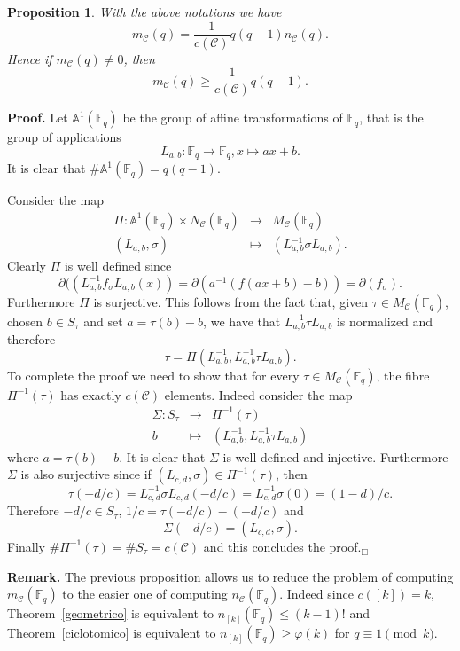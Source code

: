 \documentclass[a4paper,twoside]{article}
\newtheorem{Proposition}{Proposition}[section]
\begin{document}
\begin{Proposition}\label{normal} With the above notations
we have
$$m_{\mathcal C}(q)=\frac{1}{c(\mathcal C)}q(q-1)n_{\mathcal C}(q).$$
Hence if $m_{\mathcal C}(q)\neq0$, then
$$m_{\mathcal C}(q)\geq \frac{1}{c(\mathcal C)}q(q-1).$$
\end{Proposition}

\noindent\textbf{Proof.} Let $\mathbb A^1(\mathbb F_q)$ be the
group of affine transformations of $\mathbb F_q$, that is the
group of applications
$$L_{a,b}:\mathbb F_q \rightarrow \mathbb F_q, x\mapsto ax+b.$$
It is clear that $\#\mathbb A^1(\mathbb F_q)=q(q-1)$.

Consider the map
$$\begin{array}{rcl}
\Pi: \mathbb A^1(\mathbb F_q)\times N_{\mathcal C}(\mathbb F_q) & \rightarrow &  M_{\mathcal C}(\mathbb F_q)\\
\left(L_{a,b},\sigma\right) & \mapsto & (L_{a,b}^{-1}\sigma L_{a,b}).\end{array}$$
Clearly $\Pi$ is well defined since
$$\partial((L_{a,b}^{-1}f_\sigma L_{a,b}(x))=\partial( a^{-1}(f(ax+b)-b))=\partial(f_\sigma).$$
Furthermore $\Pi$ is surjective. This follows from the fact that,
given $\tau\in M_{\mathcal C}(\mathbb F_q)$, chosen $b\in S_\tau$
and set $a=\tau(b)-b$, we have that $L_{a,b}^{-1}\tau L_{a,b}$ is
normalized and therefore
$$\tau=\Pi(L_{a,b}^{-1},L_{a,b}^{-1}\tau L_{a,b}).$$
To complete the proof we need to show that for every $\tau\in M_{\mathcal C}(\mathbb F_q)$,
the fibre $\Pi^{-1}(\tau)$ has exactly $c(\mathcal C)$ elements. Indeed consider the map
$$\begin{array}{rcl}
\Sigma: S_\tau & \rightarrow & \Pi^{-1}(\tau)\\
      b & \mapsto & (L_{a,b}^{-1},L_{a,b}^{-1}\tau L_{a,b})\end{array}$$
where $a=\tau(b)-b$. It is clear that $\Sigma$ is well defined and injective.
Furthermore $\Sigma$ is also surjective since if $(L_{c,d},\sigma)\in \Pi^{-1}(\tau)$,
then $$\tau(-d/c)=L_{c,d}^{-1}\sigma L_{c,d}(-d/c)=L_{c,d}^{-1}\sigma(0)=(1-d)/c.$$
Therefore $-d/c\in S_\tau$, $1/c=\tau(-d/c)-(-d/c)$ and
$$\Sigma(-d/c)=(L_{c,d},\sigma).$$
Finally $\#\Pi^{-1}(\tau)=\# S_\tau=c(\mathcal C)$
and this concludes the proof.\hfill$_\Box$\bigskip

\noindent\textbf{Remark.} The previous proposition allows us to reduce the problem of computing
$m_{\mathcal C}(\mathbb F_q)$ to the easier one of computing $n_{\mathcal C}(\mathbb F_q)$.
Indeed since $c([k])=k$, Theorem~\ref{geometrico} is equivalent to $n_{[k]}(\mathbb F_q)\leq (k-1)!$ and Theorem~\ref{ciclotomico} is equivalent to $n_{[k]}(\mathbb F_q)\geq\varphi(k)$
for $q\equiv 1\pmod k$.
\end{document}
